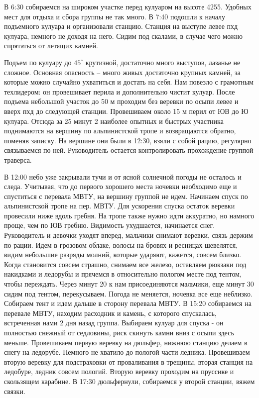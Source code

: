 В 6:30 собираемся на широком участке перед кулуаром на высоте 4255. Удобных мест для отдыха и сбора группы не так много. В 7:40 подошли к началу подъемного кулуара и организовали станцию. Станция на выступе левее пхд кулуара, немного не доходя на него. Сидим под скалами, в случае чего можно спрятаться от летящих камней.

Подъем по кулуару до $45^\circ$ крутизной, достаточно много выступов, лазанье не сложное. Основная опасность -- много живых достаточно крупных камней, за которые можно случайно ухватиться и достать на себя. Нам повезло с грамотным техлидером: он провешивает перила и дополнительно чистит кулуар. После подъема небольшой участок до 50 м проходим без веревки по осыпи левее и вверх пхд до следующей станции. Провешиваем около 15 м перил от ЮВ до Ю кулуара. Отсюда за 25 минут 2 наиболее опытных и быстрых участника поднимаются на вершину по альпинистской тропе и возвращаются обратно, поменяв записку. На вершине они были в 12:30, взяли с собой рацию, регулярно связываемся по ней. Руководитель остается контролировать прохождение группой траверса.

В 12:00 небо уже закрывали тучи и от ясной солнечной погоды не осталось и следа. Учитывая, что до первого хорошего места ночевки необходимо еще и спуститься с перевала МВТУ, на вершину группой не идем. Начинаем спуск по альпинистской тропе на пер. МВТУ. Для ускорения спуска остаток веревки провесили ниже вдоль гребня. На тропе также нужно идти аккуратно, но намного  проще, чем по ЮВ гребню. Видимость ухудшается, начинается снег. Руководитель и девочки уходят вперед, мальчики снимают веревки, связь держим по рации. Идем в грозовом облаке, волосы на бровях и ресницах шевелятся, видим небольшие разряды молний, которые ударяют, кажется, совсем близко. Когда становится совсем страшно, снимаем все железо, оставляем рюкзаки под накидками и ледорубы и прячемся в относительно пологом месте под тентом, чтобы переждать. Через минут 20 к нам присоединяются мальчики, еще минут 30 сидим под тентом, перекусываем. Погода не меняется, ночевка все еще неблизко. Собираем тент и идем дальше в сторону перевала МВТУ. В 15:20 собираемся на перевале МВТУ, находим расходник и камень, с которого спускалась, встреченная нами 2 дня назад группа. Выбираем кулуар для спуска - он полностью снежный от седловины, риск скинуть камни вниз с осыпи здесь меньше. Провешиваем первую веревку на дюльфер, нижнюю станцию делаем в снегу на ледорубе. Немного не хватило до пологой части ледника. Провешиваем вторую веревку для подстраховки от проваливания в трещины, вторая станция на ледобуре, ледник совсем пологий. Вторую веревку проходим на пруссике и скользящем карабине. В 17:30 дюльфернули, собираемся у второй станции, вяжем связки.

